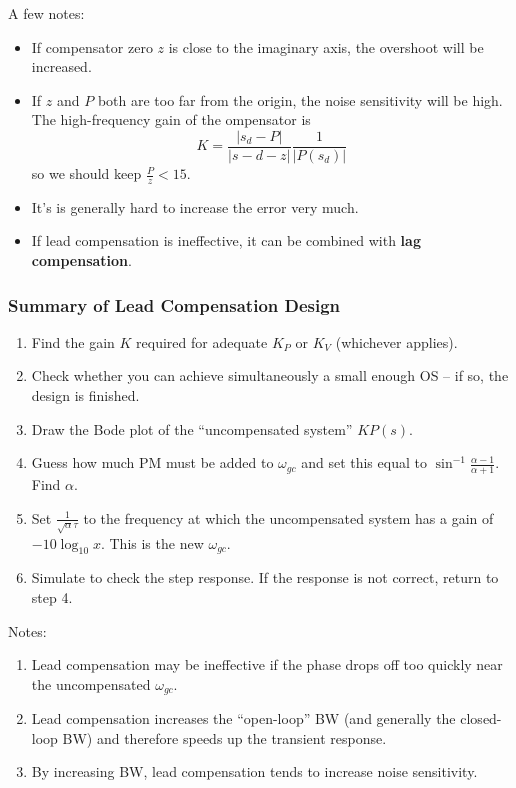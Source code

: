 \documentclass[12pt]{article}
\begin{document}
A few notes:
\begin{itemize}
\item If compensator zero $z$ is close to the imaginary axis, the overshoot will be increased.
\item If $z$ and $P$ both are too far from the origin, the noise sensitivity will be high. The high-frequency gain of the ompensator is \[ K = \frac{|s_d - P|}{|s-d - z|} \frac{1}{|P(s_d)|} \] so we should keep $\frac{P}{z} < 15$.
\item It's is generally hard to increase the error very much.
\item If lead compensation is ineffective, it can be combined with {\bf lag compensation}.
\end{itemize}

\subsubsection{Summary of Lead Compensation Design}
\begin{enumerate}
\item Find the gain $K$ required for adequate $K_P$ or $K_V$ (whichever applies).
\item Check whether you can achieve simultaneously a small enough OS -- if so, the design is finished.
\item Draw the Bode plot of the ``uncompensated system'' $KP(s)$.
\item Guess how much PM must be added to $\omega_{gc}$ and set this equal to $\sin^{-1} \frac{\alpha - 1}{\alpha + 1}$. Find $\alpha$.
\item Set $\frac{1}{\sqrt{\alpha} \tau}$ to the frequency at which the uncompensated system has a gain of $-10\log_{10} x$. This is the new $\omega_{gc}$.
\item Simulate to check the step response. If the response is not correct, return to step 4.
\end{enumerate}

Notes:
\begin{enumerate}
\item Lead compensation may be ineffective if the phase drops off too quickly near the uncompensated $\omega_{gc}$.
\item Lead compensation increases the ``open-loop'' BW (and generally the closed-loop BW) and therefore speeds up the transient response.
\item By increasing BW, lead compensation tends to increase noise sensitivity.
\end{enumerate}
\end{document}
